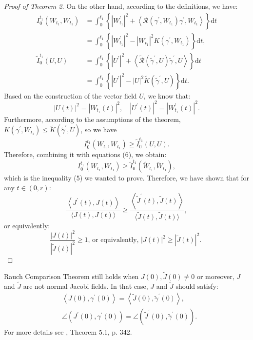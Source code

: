 \documentclass{ctexart}
\begin{document}
\begin{proof}[Proof of Theorem 2]
  On the other hand, according to the definitions, we have:
  $$
  \begin{aligned}
  I_0^{t_1}\left(W_{t_1}, W_{t_1}\right) & =\int_0^{t_1}\left\{\left|W_{t_1}^{\prime}\right|^2+\left\langle\mathcal{R}\left(\gamma^{\prime}, W_{t_1}\right) \gamma^{\prime}, W_{t_1}\right\rangle\right\} \mathrm{d} t \\
  & =\int_0^{t_1}\left\{\left|W_{t_1}^{\prime}\right|^2-\left|W_{t_1}\right|^2 K\left(\gamma^{\prime}, W_{t_1}\right)\right\} \mathrm{d} t, \\
  \tilde{I}_0^{t_1}(U, U) & =\int_0^{t_1}\left\{\left|U^{\prime}\right|^2+\left\langle\tilde{\mathcal{R}}\left(\tilde{\gamma}^{\prime}, U\right) \tilde{\gamma}^{\prime}, U\right\rangle\right\} \mathrm{d} t \\
  & =\int_0^{t_1}\left\{\left|U^{\prime}\right|^2-|U|^2 \tilde{K}\left(\tilde{\gamma}^{\prime}, U\right)\right\} \mathrm{d} t .
  \end{aligned}
  $$
  Based on the construction of the vector field $U$, we know that:
  $$
  |U(t)|^2=\left|W_{t_1}(t)\right|^2, \quad\left|U^{\prime}(t)\right|^2=\left|W_{t_1}^{\prime}(t)\right|^2 .
  $$
  Furthermore, according to the assumptions of the theorem, $K\left(\gamma^{\prime}, W_{t_1}\right) \leq \tilde{K}\left(\tilde{\gamma}^{\prime}, U\right)$, so we have 
  $$
  I_0^{t_1}\left(W_{t_1}, W_{t_1}\right) \geq \tilde{I}_0^{t_1}(U, U) .
  $$
  Therefore, combining it with equations (6), we obtain:
  $$
  I_0^{t_1}\left(W_{t_1}, W_{t_1}\right) \geq \tilde{I}_0^{t_1}\left(\tilde{W}_{t_1}, \tilde{W}_{t_1}\right),
  $$
  which is the inequality (5) we wanted to prove. Therefore, we have shown that for any $t \in (0, r)$:
  $$
  \frac{\left\langle J^{\prime}(t), J(t)\right\rangle}{\langle J(t), J(t)\rangle} \geq \frac{\left\langle\tilde{J}^{\prime}(t), \tilde{J}(t)\right\rangle}{\langle\tilde{J}(t), \tilde{J}(t)\rangle},
  $$
  or equivalently:
  $$
  \frac{|J(t)|^2}{|\tilde{J}(t)|^2} \geq 1 \text {, or equivalently, }|J(t)|^2 \geq|\tilde{J}(t)|^2 \text {. }
  $$
\end{proof}
\begin{remark}
  Rauch Comparison Theorem still holds when $J(0),\tilde{J}(0)\neq 0$ or moreover, $J$ and $\tilde{J}$ are not normal Jacobi fields. 
  In that case, $J$ and $\tilde{J}$ should satisfy: 
  $$
  \begin{aligned}
    & \left\langle J(0), \gamma^{\prime}(0)\right\rangle=\left\langle\tilde{J}(0), \tilde{\gamma}^{\prime}(0)\right\rangle, \\
    & \angle \left(J^{\prime}(0), \gamma^{\prime}(0)\right)=\angle\left(\tilde{J}^{\prime}(0), \tilde{\gamma}^{\prime}(0)\right).
  \end{aligned}  
  $$
  For more details see \cite{ChenWeiHuan2002}, Theorem 5.1, p. 342. 
\end{remark}



\end{document}
